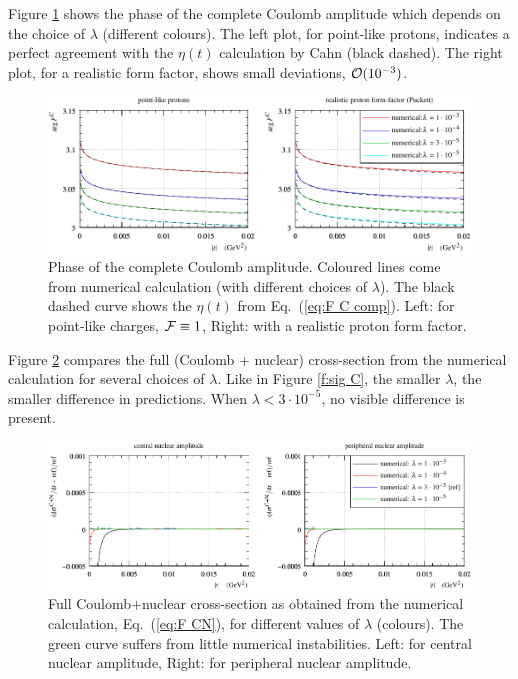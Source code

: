 \documentclass[pdftex,twocolumn,epjc3]{svjour3}
\begin{document}
Figure \ref{f:arg F C} shows the phase of the complete Coulomb amplitude which depends on the choice of $\lambda$ (different colours). The left plot, for point-like protons, indicates a perfect agreement with the $\eta(t)$ calculation by Cahn (black dashed). The right plot, for a realistic form factor, shows small deviations, ${\cal O}(10^{-3})$.

\begin{figure}[h]
\begin{center}
\includegraphics{fig/coul_complete_cmp_lambda_phase.pdf}
\caption{Phase of the complete Coulomb amplitude. Coloured lines come from numerical calculation (with different choices of $\lambda$). The black dashed curve shows the $\eta(t)$ from Eq.~(\ref{eq:F C comp}). Left: for point-like charges, ${\cal F} \equiv 1$, Right: with a realistic proton form factor.}
\label{f:arg F C}
\end{center}
\end{figure}

Figure \ref{f:sig CN} compares the full (Coulomb + nuclear) cross-section from the numerical calculation for several choices of $\lambda$. Like in Figure \ref{f:sig C}, the smaller $\lambda$, the smaller difference in predictions. When $\lambda < 3\cdot 10^{-5}$, no visible difference is present.

\begin{figure}[h]
\begin{center}
\includegraphics{fig/cni_dsdt_cmp_lambda.pdf}
\caption{Full Coulomb+nuclear cross-section as obtained from the numerical calculation, Eq.~(\ref{eq:F CN}), for different values of $\lambda$ (colours). The green curve suffers from little numerical instabilities. Left: for central nuclear amplitude, Right: for peripheral nuclear amplitude.}
\label{f:sig CN}
\end{center}
\end{figure}
\end{document}
